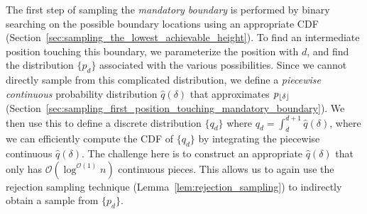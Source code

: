 The first step of sampling the \emph{mandatory boundary} is performed
by binary searching on the possible boundary locations using an appropriate CDF (Section~\ref{sec:sampling_the_lowest_achievable_height}).
To find an intermediate position touching this boundary, we parameterize the position with $d$,
and find the distribution $\{p_d\}$ associated with the various possibilities.
Since we cannot directly sample from this complicated distribution, we define a \emph{piecewise continuous} probability distribution
$\hat q(\delta)$ that approximates $p_{\lfloor\delta\rfloor}$ (Section~\ref{sec:sampling_first_position_touching_mandatory_boundary}).
We then use this to define a discrete distribution $\{q_d\}$ where $q_d = \int_d^{d+1}\hat q(\delta)$,
where we can efficiently compute the CDF of $\{q_d\}$ by integrating the piecewise continuous $\hat q(\delta)$.
The challenge here is to construct an appropriate $\hat q(\delta)$ that only has $\mathcal O(\log^{\mathcal O(1)} n)$ continuous pieces.
This allows us to again use the rejection sampling technique (Lemma~\ref{lem:rejection_sampling}) to indirectly obtain a sample from $\{p_d\}$.
